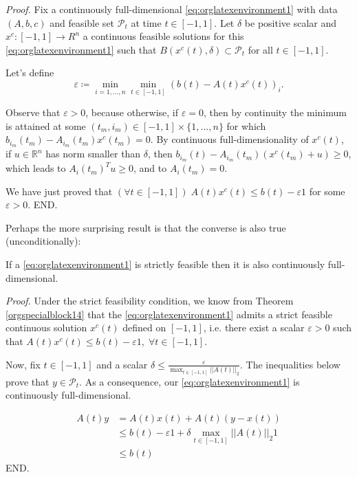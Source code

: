 \documentclass[moor]{informs1}
\renewenvironment{proof}{\emph{Proof.}}{END.}
\begin{document}
\begin{proof}
Fix a continuously full-dimensional \ref{eq:orglatexenvironment1} with data \((A, b, c)\) and feasible set \(\mathcal P_t\) at time \(t \in [-1, 1]\). Let \(\delta\) be positive scalar and  \(x^c: [-1, 1] \rightarrow R^n\) a continuous feasible solutions for this \ref{eq:orglatexenvironment1} such that \(B(x^c(t), \delta) \subset \mathcal P_t\) for all \(t \in [-1, 1]\).


Let's define
$$\varepsilon \coloneqq \min_{i=1, \ldots, n} \min_{t \in [-1, 1]} (b(t) - A(t)x^c(t))_i.$$

Observe that \(\varepsilon > 0\), because otherwise, if \(\varepsilon = 0\), then by continuity the minimum is attained at some \((t_m, i_m) \in [-1, 1] \times \{1, \ldots, n\}\) for which \(b_{i_m}(t_m) - A_{i_m}(t_m)x^c(t_m) = 0\). By continuous full-dimensionality of \(x^c(t)\), if \(u \in \mathbb R^n\) has norm smaller than  \(\delta\), then \(b_{i_m}(t) - A_{i_m}(t_m)(x^c(t_m) + u) \ge 0\), which leads to \(A_i(t_m)^Tu \ge 0\), and to \(A_i(t_m) = 0\).

We have just proved that \((\forall t \in [-1, 1]) \; A(t) x^c(t) \le b(t) - \varepsilon 1\) for some \(\varepsilon > 0\).
\end{proof}

Perhaps the more surprising result is that the converse is also true (unconditionally):

\begin{thm}
If a \ref{eq:orglatexenvironment1} is strictly feasible then it is also continuously full-dimensional.
\end{thm}

\begin{proof}
Under the strict feasibility condition, we know from Theorem \ref{orgspecialblock14} that the \ref{eq:orglatexenvironment1} admits a strict feasible continuous solution \(x^c(t)\) defined on \([-1, 1]\), i.e. there exist a scalar \(\varepsilon > 0\)
such that \(A(t)x^c(t) \le b(t) - \varepsilon 1,\; \forall t \in [-1, 1]\).

Now, fix \(t \in [-1, 1]\) and a scalar \(\delta \le \frac{\varepsilon}{\max_{t \in [-1, 1]} ||A(t)||_2}\). The inequalities below prove that \(y \in \mathcal P_t\). As a consequence, our \ref{eq:orglatexenvironment1} is continuously full-dimensional.

\begin{align*}
A(t)y &= A(t)x(t) + A(t) (y - x(t))
\\&\le b(t) - \varepsilon 1 + \delta \max_{t \in [-1, 1]} ||A(t)||_2 1
\\&\le b(t)
\end{align*}
\end{proof}
\end{document}
